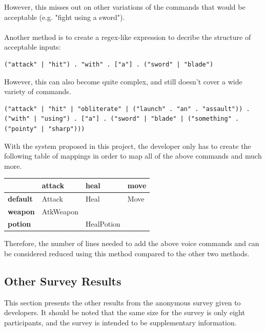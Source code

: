 \documentclass[11pt]{article}
\begin{document}
However, this misses out on other variations of the commands that would be acceptable (e.g. "fight using a sword").
\\
\\
Another method is to create a regex-like expression to decribe the structure of acceptable inputs:

\begin{lstlisting}
("attack" | "hit") . "with" . ["a"] . ("sword" | "blade")
\end{lstlisting}

However, this can also become quite complex, and still doesn't cover a wide variety of commands.

\begin{lstlisting}
("attack" | "hit" | "obliterate" | ("launch" . "an" . "assault")) . ("with" | "using") . ["a"] . ("sword" | "blade" | ("something" . ("pointy" | "sharp")))
\end{lstlisting}

With the system proposed in this project, the developer only has to create the following table of mappings in order to map all of the above commands and much more.

\begin{table}[H]
\centering
\label{comparison-table}
\begin{tabular}{l|l|l|l}
                 & \textbf{attack} & \textbf{heal} & \textbf{move} \\ \hline
\textbf{default} & Attack          & Heal          & Move          \\ \hline
\textbf{weapon}  & AtkWeapon       &               &                 \\ \hline
\textbf{potion}  &                 & HealPotion    & \\
\end{tabular}
\end{table}

Therefore, the number of lines needed to add the above voice commands and can be considered reduced using this method compared to the other two methods.

\newpage
\subsection{Other Survey Results}
\label{appendix:survey-results}

This section presents the other results from the anonymous survey given to developers. It should be noted that the same size for the survey is only eight participants, and the survey is intended to be supplementary information.
\end{document}
